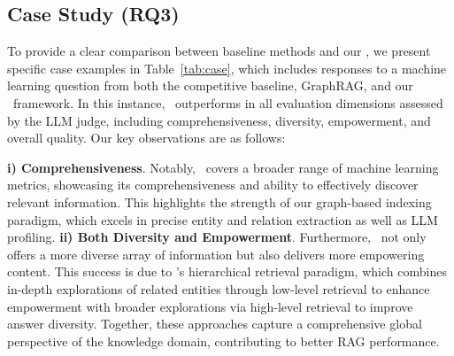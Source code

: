\subsection{Case Study (RQ3)}
To provide a clear comparison between baseline methods and our \model, we present specific case examples in Table~\ref{tab:case}, which includes responses to a machine learning question from both the competitive baseline, GraphRAG, and our \model\ framework. In this instance, \model\ outperforms in all evaluation dimensions assessed by the LLM judge, including comprehensiveness, diversity, empowerment, and overall quality. Our key observations are as follows:

\textbf{i) Comprehensiveness}. Notably, \model\ covers a broader range of machine learning metrics, showcasing its comprehensiveness and ability to effectively discover relevant information. This highlights the strength of our graph-based indexing paradigm, which excels in precise entity and relation extraction as well as LLM profiling.
\textbf{ii) Both Diversity and Empowerment}.
Furthermore, \model\ not only offers a more diverse array of information but also delivers more empowering content. This success is due to \model's hierarchical retrieval paradigm, which combines in-depth explorations of related entities through low-level retrieval to enhance empowerment with broader explorations via high-level retrieval to improve answer diversity. Together, these approaches capture a comprehensive global perspective of the knowledge domain, contributing to better RAG performance.

